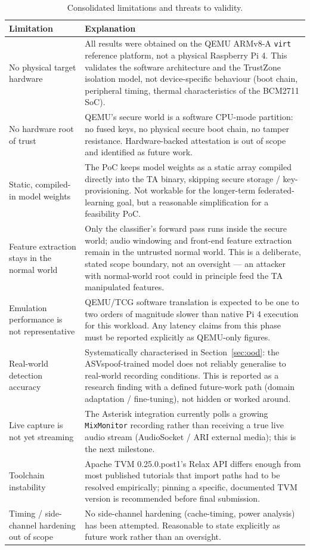 \documentclass[11pt,a4paper]{report}
\newcommand{\code}[1]{\texttt{\small #1}}
\begin{document}
\begin{table}[H]
\centering
\small
\begin{tabularx}{\textwidth}{@{}p{3.9cm}X@{}}
\toprule
\textbf{Limitation} & \textbf{Explanation} \\
\midrule
No physical target hardware & All results were obtained on the QEMU ARMv8-A \code{virt} reference
platform, not a physical Raspberry Pi 4. This validates the software architecture and the
TrustZone isolation model, not device-specific behaviour (boot chain, peripheral timing, thermal
characteristics of the BCM2711 SoC). \\
No hardware root of trust & QEMU's secure world is a software CPU-mode partition: no fused keys,
no physical secure boot chain, no tamper resistance. Hardware-backed attestation is out of scope
and identified as future work. \\
Static, compiled-in model weights & The PoC keeps model weights as a static array compiled
directly into the TA binary, skipping secure storage / key-provisioning. Not workable for the
longer-term federated-learning goal, but a reasonable simplification for a feasibility PoC. \\
Feature extraction stays in the normal world & Only the classifier's forward pass runs inside the
secure world; audio windowing and front-end feature extraction remain in the untrusted normal
world. This is a deliberate, stated scope boundary, not an oversight --- an attacker with
normal-world root could in principle feed the TA manipulated features. \\
Emulation performance is not representative & QEMU/TCG software translation is expected to be one
to two orders of magnitude slower than native Pi 4 execution for this workload. Any latency claims
from this phase must be reported explicitly as QEMU-only figures. \\
Real-world detection accuracy & Systematically characterised in Section~\ref{sec:ood}: the
ASVspoof-trained model does not reliably generalise to real-world recording conditions. This is
reported as a research finding with a defined future-work path (domain adaptation / fine-tuning),
not hidden or worked around. \\
Live capture is not yet streaming & The Asterisk integration currently polls a growing
\code{MixMonitor} recording rather than receiving a true live audio stream (AudioSocket / ARI
external media); this is the next milestone. \\
Toolchain instability & Apache TVM 0.25.0.post1's Relax API differs enough from most published
tutorials that import paths had to be resolved empirically; pinning a specific, documented TVM
version is recommended before final submission. \\
Timing / side-channel hardening out of scope & No side-channel hardening (cache-timing, power
analysis) has been attempted. Reasonable to state explicitly as future work rather than an
oversight. \\
\bottomrule
\end{tabularx}
\caption{Consolidated limitations and threats to validity.}
\label{tab:limitations}
\end{table}
\end{document}
